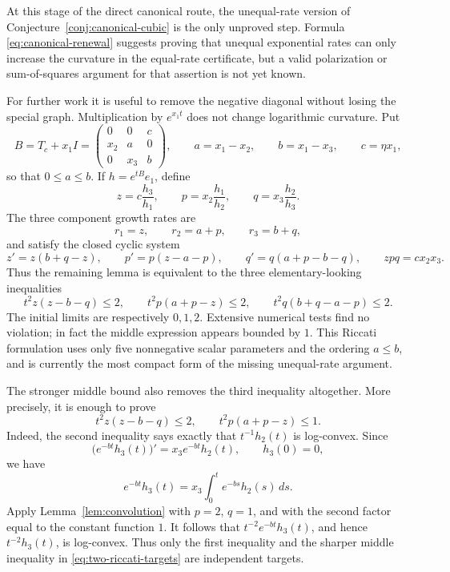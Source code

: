 \documentclass[11pt]{article}
\theoremstyle{remark}
\begin{document}
At this stage of the direct canonical route, the unequal-rate version of
Conjecture~\ref{conj:canonical-cubic} is the only unproved step.  Formula
\eqref{eq:canonical-renewal} suggests proving that unequal exponential rates
can only increase the curvature in the equal-rate certificate, but a valid
polarization or sum-of-squares argument for that assertion is not yet known.

For further work it is useful to remove the negative diagonal without losing
the special graph.  Multiplication by $e^{x_1t}$ does not change logarithmic
curvature.  Put
\[
 B=T_c+x_1I=
 \begin{pmatrix}
 0&0&c\\ x_2&a&0\\0&x_3&b
 \end{pmatrix},\qquad
 a=x_1-x_2,\qquad b=x_1-x_3,\qquad c=\eta x_1,
\]
so that $0\leq a\leq b$.  If $h=e^{tB}e_1$, define
\[
 z=c\frac{h_3}{h_1},\qquad
 p=x_2\frac{h_1}{h_2},\qquad
 q=x_3\frac{h_2}{h_3}.
\]
The three component growth rates are
\[
 r_1=z,\qquad r_2=a+p,\qquad r_3=b+q,
\]
and satisfy the closed cyclic system
\begin{equation}\label{eq:canonical-rate-system}
 z'=z(b+q-z),\qquad
 p'=p(z-a-p),\qquad
 q'=q(a+p-b-q),
 \qquad zpq=cx_2x_3.
\end{equation}
Thus the remaining lemma is equivalent to the three elementary-looking
inequalities
\[
 t^2z(z-b-q)\leq2,\qquad
 t^2p(a+p-z)\leq2,\qquad
 t^2q(b+q-a-p)\leq2.
\]
The initial limits are respectively $0,1,2$.  Extensive numerical tests find
no violation; in fact the middle expression appears bounded by $1$.  This
Riccati formulation uses only five nonnegative scalar parameters and the
ordering $a\leq b$, and is currently the most compact form of the missing
unequal-rate argument.

The stronger middle bound also removes the third inequality altogether.
More precisely, it is enough to prove
\begin{equation}\label{eq:two-riccati-targets}
 t^2z(z-b-q)\leq2,
 \qquad
 t^2p(a+p-z)\leq1.
\end{equation}
Indeed, the second inequality says exactly that $t^{-1}h_2(t)$ is
log-convex.  Since
\[
 \bigl(e^{-bt}h_3(t)\bigr)'=x_3e^{-bt}h_2(t),
 \qquad h_3(0)=0,
\]
we have
\[
 e^{-bt}h_3(t)=x_3\int_0^t e^{-bs}h_2(s)\,ds.
\]
Apply Lemma~\ref{lem:convolution} with $p=2$, $q=1$, and with the
second factor equal to the constant function $1$.  It follows that
$t^{-2}e^{-bt}h_3(t)$, and hence $t^{-2}h_3(t)$, is log-convex.  Thus only
the first inequality and the sharper middle inequality in
\eqref{eq:two-riccati-targets} are independent targets.
\end{document}
